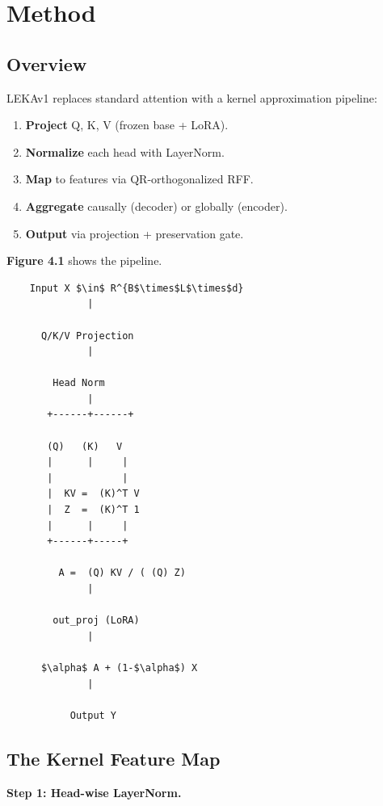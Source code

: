 \section{Method}

\subsection{Overview}

LEKAv1 replaces standard attention with a kernel approximation pipeline:

\begin{enumerate}
\item \textbf{Project} Q, K, V (frozen base + LoRA).
\item \textbf{Normalize} each head with LayerNorm.
\item \textbf{Map} to features via QR-orthogonalized RFF.
\item \textbf{Aggregate} causally (decoder) or globally (encoder).
\item \textbf{Output} via projection + preservation gate.

\end{enumerate}
\textbf{Figure 4.1} shows the pipeline.

\begin{lstlisting}
    Input X $\in$ R^{B$\times$L$\times$d}
              |
               
      Q/K/V Projection
              |
               
        Head Norm
              |
       +------+------+
                      
       (Q)   (K)   V
       |      |     |
       |            |
       |  KV =  (K)^T V
       |  Z  =  (K)^T 1
       |      |     |
       +------+-----+
               
         A =  (Q) KV / ( (Q) Z)
              |
               
        out_proj (LoRA)
              |
               
      $\alpha$ A + (1-$\alpha$) X
              |
               
           Output Y
\end{lstlisting}

\subsection{The Kernel Feature Map}

\textbf{Step 1: Head-wise LayerNorm.}

